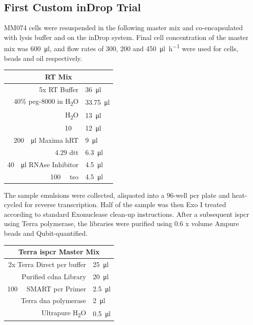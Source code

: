 \begin{appendix}
\begin{multicols}{2}
\subsection{First Custom inDrop Trial}
\label{app:meth_first_indrop_trial}
MM074 cells were resuspended in the following master mix and co-encapsulated with lysis buffer and  on the inDrop system. Final cell concentration of the master mix was \SI{600}{\ul}, and flow rates of 300, 200 and \SI[per-mode=symbol]{450}{\ul\per\hour} were used for cells, beads and oil respectively.\pms

\begin{center}
\begin{tabular}{r|l}
	\multicolumn{2}{c}{RT Mix} \\
	\hline
	5x RT Buffer & \SI{36}{\ul} \\
	40\% \acrshort{peg}-8000 in H\textsubscript{2}O & \SI{33.75}{\ul} \\
	H\textsubscript{2}O & \SI{13}{\ul} \\
	\SI{10}{\micro\molar} \acrshortpl{dntp} & \SI{12}{\ul} \\
	\SI{200}{\unit\per\ul} Maxima hRT & \SI{9}{\ul} \\
	\SI{4.29}{\molar} \acrshort{dtt} & \SI{6.3}{\ul} \\
	\SI{40}{\unit\per\ul} RNAse Inhibitor & \SI{4.5}{\ul} \\
	\SI{100}{\micro\molar} \acrshort{tso} & \SI{4.5}{\ul} \\
\end{tabular}
\end{center}
\medskip

The sample emulsions were collected, aliquoted into a 96-well \acrshort{pcr} plate and heat-cycled for reverse transcription. Half of the sample was then Exo I treated according to standard Exonuclease clean-up instructions. After a subsequent \acrshort{ispcr} using Terra polymerase, the libraries were purified using 0.6 x volume Ampure beads and Qubit-quantified.\pms

\begin{center}
\begin{tabular}{r|l}
	\multicolumn{2}{c}{Terra \acrshort{ispcr} Master Mix} \\
	\hline
	2x Terra Direct \acrshort{pcr} buffer & \SI{25}{\ul} \\
	Purified \acrshort{cdna} Library & \SI{20}{\ul} \\
	\SI{100}{\micro\molar} SMART \acrshort{pcr} Primer & \SI{2.5}{\ul} \\
	Terra \acrshort{dna} polymerase	& \SI{2}{\ul} \\
	Ultrapure H\textsubscript{2}O & \SI{0.5}{\ul} \\
\end{tabular}
\end{center}
\medskip


\end{multicols}
\end{appendix}
